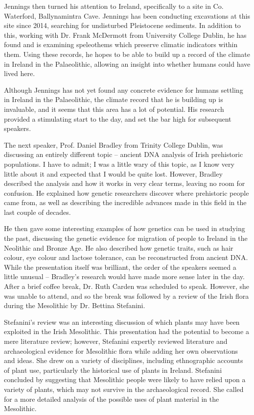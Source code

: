 Jennings then turned his attention to Ireland, specifically to a site in Co. Waterford, Ballynamintra Cave. Jennings has been conducting excavations at this site since 2014, searching for undisturbed Pleistocene sediments. In addition to this, working with Dr. Frank McDermott from University College Dublin, he has found and is examining speleothems which preserve climatic indicators within them. Using these records, he hopes to be able to build up a record of the climate in Ireland in the Palaeolithic, allowing an insight into whether humans could have lived here. 

Although Jennings has not yet found any concrete evidence for humans settling in Ireland in the Palaeolithic, the climate record that he is building up is invaluable, and it seems that this area has a lot of potential. His research provided a stimulating start to the day, and set the bar high for subsequent speakers. 

The next speaker, Prof. Daniel Bradley from Trinity College Dublin, was discussing an entirely different topic – ancient DNA analysis of Irish prehistoric populations. I have to admit; I was a little wary of this topic, as I know very little about it and expected that I would be quite lost. However, Bradley described the analysis and how it works in very clear terms, leaving no room for confusion. He explained how genetic researchers discover where prehistoric people came from, as well as describing the incredible advances made in this field in the last couple of decades. 

He then gave some interesting examples of how genetics can be used in studying the past, discussing the genetic evidence for migration of people to Ireland in the Neolithic and Bronze Age. He also described how genetic traits, such as hair colour, eye colour and lactose tolerance, can be reconstructed from ancient DNA. While the presentation itself was brilliant, the order of the speakers seemed a little unusual – Bradley’s research would have made more sense later in the day. 
After a brief coffee break, Dr. Ruth Carden was scheduled to speak. However, she was unable to attend, and so the break was followed by a review of the Irish flora during the Mesolithic by Dr. Bettina Stefanini. 

Stefanini’s review was an interesting discussion of which plants may have been exploited in the Irish Mesolithic. This presentation had the potential to become a mere literature review; however, Stefanini expertly reviewed literature and archaeological evidence for Mesolithic flora while adding her own observations and ideas. She drew on a variety of disciplines, including ethnographic accounts of plant use, particularly the historical use of plants in Ireland. Stefanini concluded by suggesting that Mesolithic people were likely to have relied upon a variety of plants, which may not survive in the archaeological record. She called for a more detailed analysis of the possible uses of plant material in the Mesolithic. 

